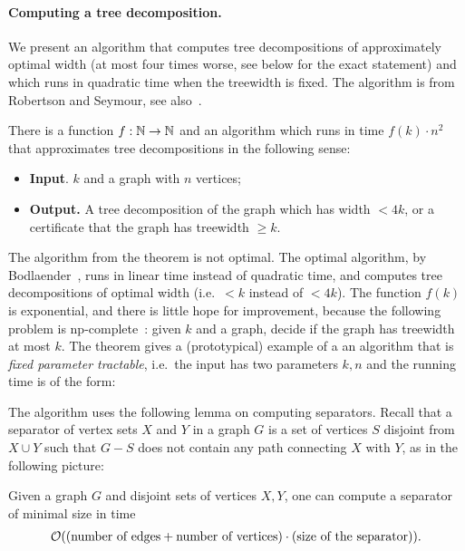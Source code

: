 \paragraph*{Computing a tree decomposition.}  We present  an algorithm that computes tree decompositions of approximately optimal width (at most four times worse, see below for the exact statement) and which runs in quadratic time when the treewidth is fixed. The algorithm is from Robertson and Seymour, see also~\cite[Theorem 7.18]{Cygan:2015wu}.
\begin{theorem}\label{thm:compute-tree-decomposition}
There is a function $f : \mathbb{N} \to \mathbb{N}$ and an algorithm which runs in time $f(k) \cdot n^2$ that approximates tree decompositions in the following sense:
\begin{itemize}
	\item {\bf Input}. $k$ and a graph with $n$ vertices;
\item{\bf Output.}  A tree decomposition of the graph which has width  $<4k$, or a certificate that the graph has treewidth  $\ge k$.
\end{itemize}
\end{theorem}
The algorithm from the  theorem is not optimal. The optimal algorithm, by Bodlaender~\cite{Bodlaender:1993da}, runs in linear time  instead of  quadratic  time, and  computes tree decompositions of optimal width (i.e.~$<k$ instead of $<4k$). The function $f(k)$ is exponential, and there is little hope for improvement, because the following problem is {\sc np}-complete~\cite{Arnborg:1987jy}: given $k$ and a graph, decide if the graph has treewidth at most $k$.
The theorem gives a (prototypical) example of a an algorithm that is \emph{fixed parameter tractable}, i.e.~the input has  two parameters $k,n$ and the  running time is of the  form:



\vfill

The algorithm   uses the following lemma on computing separators.
Recall that a separator of vertex sets $X$ and $Y$ in a graph $G$ is a set of vertices $S$ disjoint from $X \cup Y$ such that $G-S$ does not contain any path connecting $X$ with $Y$, as in the following picture:

\begin{lemma}\label{lem:ford-fulkerson}
Given a graph $G$ and disjoint sets of vertices $X,Y$, one can compute  a separator of minimal size in time 
\begin{align*}
\mathcal{O} ((\text{number of edges} + \text{number of vertices}) \cdot (\text{size of the separator})).\end{align*}
\end{lemma}

